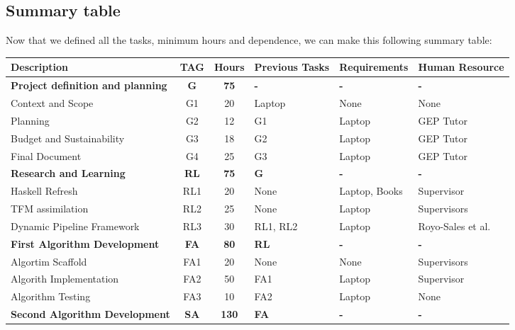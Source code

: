 \subsection{Summary table}
Now that we defined all the tasks, minimum hours and dependence, we can make this following summary table:
\begin{table}[H]
    \begin{adjustwidth}{-1in}{-1in}
    \centering
    \begin{tabular}{|p{5cm}|c|c|p{2cm}|p{3cm}|p{3cm}|}
    \hline
    \textbf{Description} & \textbf{TAG} & \textbf{Hours} & \textbf{Previous Tasks} & \textbf{Requirements} & \textbf{Human Resource} \\
    \hline
    \hline	
    \rowcolor{LightGray}
    \textbf{Project definition and planning} & \textbf{G} & \textbf{75} & \textbf{-} & \textbf{-} & \textbf{-}  \\
    \hline
    Context and Scope & G1 & 20 & Laptop & None & None \\
    \hline
    Planning & G2 & 12 & G1 & Laptop & GEP Tutor \\
    \hline
    Budget and Sustainability & G3 & 18 & G2 & Laptop & GEP Tutor \\
    \hline
    Final Document & G4 & 25 & G3 & Laptop & GEP Tutor \\
    \hline
    \hline
    \rowcolor{LightGray}
    \textbf{Research and Learning} & \textbf{RL} & \textbf{75} & \textbf{G} & \textbf{-} & \textbf{-} \\
    \hline
    Haskell Refresh & RL1 & 20 & None & Laptop, Books & Supervisor \\
    \hline
    TFM assimilation & RL2 & 25 & None & Laptop & Supervisors \\
    \hline
    Dynamic Pipeline Framework & RL3 & 30 & RL1, RL2 & Laptop & Royo-Sales et al. \cite{royo_sales_algorithm_2021} \\
    \hline
    \hline
    \rowcolor{LightGray}
    \textbf{First Algorithm Development} & \textbf{FA} & \textbf{80} & \textbf{RL} & \textbf{-} & \textbf{-} \\
    \hline
    Algortim Scaffold & FA1 & 20 & None & None & Supervisors\\
    \hline
    Algorith Implementation & FA2 & 50 & FA1 & Laptop & Supervisor\\
    \hline
    Algorithm Testing & FA3 & 10 & FA2 & Laptop & None \\
    \hline
    \hline
    \rowcolor{LightGray}
    \textbf{Second Algorithm Development} & \textbf{SA} & \textbf{130} & \textbf{FA} & \textbf{-} & \textbf{-} \\

\end{tabular}
\end{adjustwidth}
\end{table}
